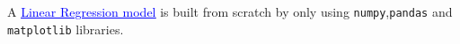 \documentclass{homework}
\begin{document}
\section{}
A \href{https://github.com/IITH-Epoch/Handouts-2022-2023/blob/main/Linear%20Regression/Linear%20Regression.ipynb}{\textcolor{blue}{\underline{Linear Regression model}}} is built from scratch by only using \texttt{numpy},\texttt{pandas} and \texttt{matplotlib} libraries.\\
% 

\end{document}
